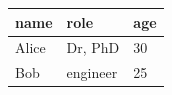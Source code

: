 \documentclass[11pt,a4paper]{article}
\begin{document}
\begin{table}[h]
\begin{tabular}{|l|l|l|}
\hline
name & role & age \\ \hline
Alice & Dr, PhD & 30 \\ \hline
Bob & engineer & 25 \\ \hline
\end{tabular}
\end{table}
\end{document}
